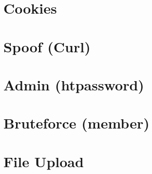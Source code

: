 \section{Cookies}




\section{Spoof (Curl)}




\section{Admin (htpassword)}




\section{Bruteforce (member)}




\section{File Upload}




